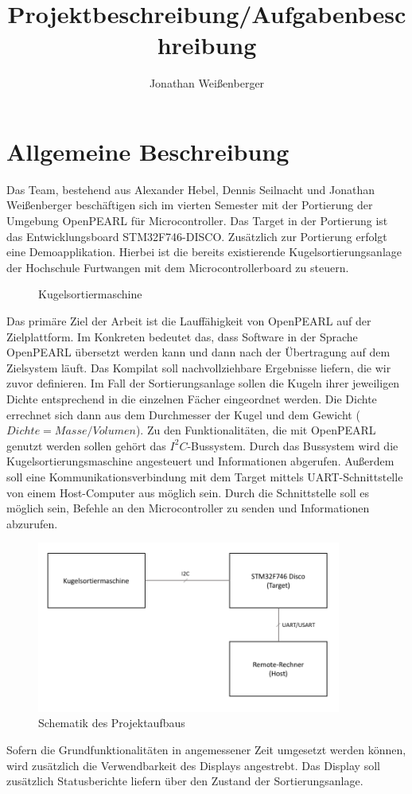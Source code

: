 \documentclass[12pt,a4paper]{article}
\author{Jonathan Weißenberger}
\title{Projektbeschreibung/Aufgabenbeschreibung}
\begin{document}
\maketitle
\newpage
\tableofcontents
\newpage
\section{Allgemeine Beschreibung}
Das Team, bestehend aus Alexander Hebel, Dennis Seilnacht und Jonathan Weißenberger beschäftigen sich im vierten Semester mit der Portierung der Umgebung OpenPEARL für Microcontroller. Das Target in der Portierung ist das Entwicklungsboard STM32F746-DISCO. Zusätzlich zur Portierung erfolgt eine Demoapplikation. Hierbei ist die bereits existierende Kugelsortierungsanlage der Hochschule Furtwangen mit dem Microcontrollerboard zu steuern.
\begin{figure}[h]
\begin{center}
\caption{Kugelsortiermaschine}
\label{bild_kugelsortiermaschine}
\end{center}
\end{figure}
Das primäre Ziel der Arbeit ist die Lauffähigkeit von OpenPEARL auf der Zielplattform. Im Konkreten bedeutet das, dass Software in der Sprache OpenPEARL übersetzt werden kann und dann nach der Übertragung auf dem Zielsystem läuft. Das Kompilat soll nachvollziehbare Ergebnisse liefern, die wir zuvor definieren. Im Fall der Sortierungsanlage sollen die Kugeln ihrer jeweiligen Dichte entsprechend in die einzelnen Fächer eingeordnet werden. Die Dichte errechnet sich dann aus dem Durchmesser der Kugel und dem Gewicht ($Dichte=Masse/Volumen$). Zu den Funktionalitäten, die mit OpenPEARL genutzt werden sollen gehört das $I^2C$-Bussystem. Durch das Bussystem wird die Kugelsortierungsmaschine angesteuert und Informationen abgerufen. Außerdem soll eine Kommunikationsverbindung mit dem Target mittels UART-Schnittstelle von einem Host-Computer aus möglich sein. Durch die Schnittstelle soll es möglich sein, Befehle an den Microcontroller zu senden und Informationen abzurufen. 
\begin{figure}[h]
\begin{center}
\includegraphics[width=10cm]{grafiken/Schematik.png}
\caption{Schematik des Projektaufbaus}
\label{schematik_projektaufbau}
\end{center}
\end{figure}
Sofern die Grundfunktionalitäten in angemessener Zeit umgesetzt werden können, wird zusätzlich die Verwendbarkeit des Displays angestrebt. Das Display soll zusätzlich Statusberichte liefern über den Zustand der Sortierungsanlage. 
\end{document}
